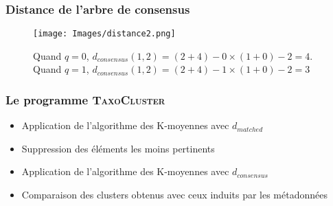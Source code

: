 \documentclass{beamer}
\begin{document}
\begin{frame}
\frametitle{Distance de l'arbre de consensus}

\begin{figure}
\centering
\texttt{[image: Images/distance2.png]}
\caption{Quand $q = 0$, $d_{consensus}(1,2) = (2 + 4) - 0 \times (1 + 0) - 2 = 4$.\\
Quand $q = 1$, $d_{consensus}(1,2) = (2 + 4) - 1 \times (1 + 0) - 2 = 3$}
\end{figure}

\end{frame}

\begin{frame}
\frametitle{Le programme \textsc{\bf TaxoCluster}}



\begin{itemize}
\item Application de l'algorithme des K-moyennes avec $d_{matched}$
\bigskip
\item Suppression des éléments les moins pertinents 
\bigskip
\item Application de l'algorithme des K-moyennes avec $d_{consensus}$
\bigskip
\item Comparaison des \alert{clusters} obtenus avec ceux induits par les métadonnées
\end{itemize}

\end{frame}
\end{document}
